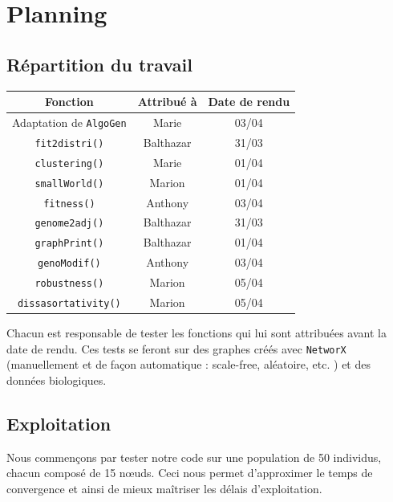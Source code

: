 \section{Planning}
\subsection{Répartition du travail}

\begin{center}
\begin{table}[!h]
\begin{tabular}{|c|c|c|}
\hline \textbf{Fonction} & \textbf{Attribué à} & \textbf{Date de rendu} \\
\hline
Adaptation de \verb?AlgoGen? & Marie & 03/04 \\
\hline
\verb?fit2distri()? & Balthazar & 31/03 \\
\hline
\verb?clustering()? & Marie & 01/04\\
\hline 
\verb?smallWorld()? & Marion & 01/04\\
\hline
\verb?fitness()? & Anthony & 03/04\\
\hline 
\verb?genome2adj()? & Balthazar & 31/03 \\
\hline 
\verb?graphPrint()? & Balthazar & 01/04 \\
\hline 
\verb?genoModif()? & Anthony & 03/04 \\
\hline 
\verb?robustness()? & Marion & 05/04 \\
\hline 
\verb?dissasortativity()? & Marion & 05/04\\
\hline 
\end{tabular}
\end{table}
\end{center}

Chacun est responsable de tester les fonctions qui lui sont attribuées avant la date de rendu. Ces tests se feront sur des graphes créés avec \verb?NetworX? (manuellement et de façon automatique : scale-free, aléatoire, etc. ) et des données biologiques.

\subsection{Exploitation}

Nous commençons par tester notre code sur une population de 50 individus, chacun composé de 15 nœuds. Ceci nous permet d'approximer le temps de convergence et ainsi de mieux ma\^itriser les délais d'exploitation.

